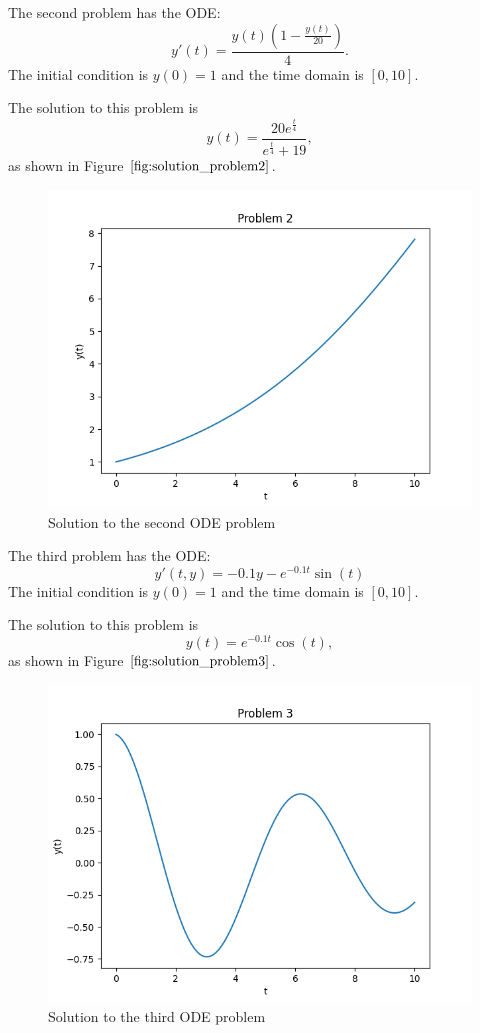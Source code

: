 \documentclass{article}
\begin{document}
The second problem has the ODE:
\begin{equation}
y'(t) = \frac{y(t)(1 - \frac{y(t)}{20})}{4}.
\end{equation}
The initial condition is $y(0) = 1$ and the time domain is $[0, 10]$.

The solution to this problem is
\begin{equation}
y(t) = \frac{20e^{\frac{t}{4}}}{e^{\frac{t}{4}} + 19},
\end{equation}
as shown in Figure $\ref{fig:solution_problem2}$.

\begin{figure}[H]
\centering
\includegraphics[width=0.7\linewidth]{./figures/solution_problem2}
\caption{Solution to the second ODE problem}
\label{fig:solution_problem2}
\end{figure}

The third problem has the ODE:
\begin{equation}
y'(t, y) = -0.1y - e^{-0.1t}\sin(t)
\end{equation}
The initial condition is $y(0) = 1$ and the time domain is $[0, 10]$.

The solution to this problem is 
\begin{equation}
y(t) = e^{-0.1t}\cos(t),
\end{equation}
as shown in Figure $\ref{fig:solution_problem3}$.

\begin{figure}[H]
\centering
\includegraphics[width=0.7\linewidth]{./figures/solution_problem3}
\caption{Solution to the third ODE problem}
\label{fig:solution_problem3}
\end{figure}
\end{document}
